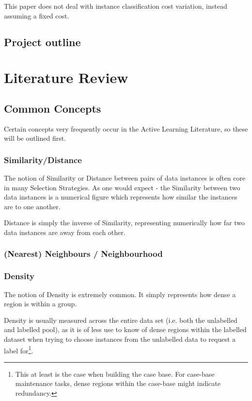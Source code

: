 \documentclass[a4paper,11pt]{report}
\begin{document}
This paper does not deal with instance classification cost variation, instead assuming a fixed cost.

\section{Project outline}


\chapter{Literature Review}

\section{Common Concepts}
Certain concepts very frequently occur in the Active Learning Literature, so these will be outlined first.

\subsection{Similarity/Distance}
The notion of Similarity or Distance between pairs of data instances is often core in many Selection Strategies. As one would expect - the Similarity between two data instances is a numerical figure which represents how similar the instances are to one another.

Distance is simply the inverse of Similarity, representing numerically how far two data instances are away from each other.

\subsection{(Nearest) Neighbours / Neighbourhood}

\subsection{Density}
The notion of Density is extremely common. It simply represents how dense a region is within a group.

Density is usually measured across the entire data set (i.e. both the unlabelled and labelled pool), as it is of less use to know of dense regions within the labelled dataset when trying to choose instances from the unlabelled data to request a label for\footnote{This at least is the case when building the case base. For case-base maintenance tasks, dense regions within the case-base might indicate redundancy.}. 
\end{document}
